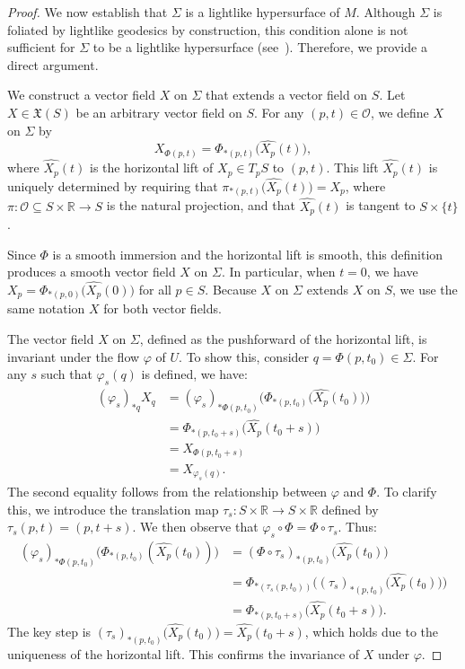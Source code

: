 \documentclass[11pt]{article}
\numberwithin{equation}{section}
\begin{document}
\begin{proof}
		We now establish that $\Sigma$ is a lightlike hypersurface of $M$. Although $\Sigma$ is foliated by lightlike geodesics by construction, this condition alone is not sufficient for $\Sigma$ to be a lightlike hypersurface (see~). Therefore, we provide a direct argument.
		
		We construct a vector field $X$ on $\Sigma$ that extends a vector field on $S$. Let $X \in \mathfrak{X}(S)$ be an arbitrary vector field on $S$. For any $(p, t) \in \mathscr{O}$, we define $X$ on $\Sigma$ by
		\[
		X_{\Phi(p, t)} = \Phi_{*(p, t)}\bigl(\widehat{X_p}(t)\bigr),
		\]
		where $\widehat{X_p}(t)$ is the horizontal lift of $X_p \in T_p S$ to $(p, t)$. This lift $\widehat{X_p}(t)$ is uniquely determined by requiring that $\pi_{*(p, t)}\bigl(\widehat{X_p}(t)\bigr) = X_p$, where $\pi\colon \mathscr{O} \subseteq S \times \mathbb{R} \to S$ is the natural projection, and that $\widehat{X_p}(t)$ is tangent to $S \times \{t\}$.
		
		Since $\Phi$ is a smooth immersion and the horizontal lift is smooth, this definition produces a smooth vector field $X$ on $\Sigma$. In particular, when $t = 0$, we have $X_p = \Phi_{*(p, 0)}\bigl(\widehat{X_p}(0)\bigr)$ for all $p \in S$. Because $X$ on $\Sigma$ extends $X$ on $S$, we use the same notation $X$ for both vector fields.
		
		The vector field $X$ on $\Sigma$, defined as the pushforward of the horizontal lift, is invariant under the flow $\varphi$ of $U$. To show this, consider $q = \Phi(p,t_0) \in \Sigma$. For any $s$ such that $\varphi_s(q)$ is defined, we have:
		\begin{align*}
			(\varphi_s)_{*q}X_q &= (\varphi_s)_{*\Phi(p,t_0)} \bigl(\Phi_{*(p,t_0)}\bigl(\widehat{X_p}(t_0)\bigr)\bigr) \\
			&= \Phi_{*(p,t_0 + s)}\bigl(\widehat{X_p}(t_0 + s)\bigr) \\
			&= X_{\Phi(p,t_0 + s)} \\
			&= X_{\varphi_s(q)}.
		\end{align*}
		The second equality follows from the relationship between $\varphi$ and $\Phi$. To clarify this, we introduce the translation map $\tau_s\colon S \times \mathbb{R} \to S \times \mathbb{R}$ defined by $\tau_s(p,t) = (p, t + s)$. We then observe that $\varphi_s \circ \Phi = \Phi \circ \tau_s$. Thus:
		\begin{align*}
			(\varphi_s)_{*\Phi(p,t_0)} \bigl(\Phi_{*(p,t_0)}(\widehat{X_p}(t_0))\bigr) &= (\Phi \circ \tau_s)_{*(p,t_0)}\bigl(\widehat{X_p}(t_0)\bigr) \\
			&= \Phi_{*(\tau_s(p,t_0))} \bigl((\tau_s)_{*(p,t_0)}\bigl(\widehat{X_p}(t_0)\bigr)\bigr) \\
			&= \Phi_{*(p,t_0 + s)}\bigl(\widehat{X_p}(t_0 + s)\bigr).
		\end{align*}
		The key step is $(\tau_s)_{*(p,t_0)}\bigl(\widehat{X_p}(t_0)\bigr) = \widehat{X_p}(t_0 + s)$, which holds due to the uniqueness of the horizontal lift. This confirms the invariance of $X$ under $\varphi$.
		

\end{proof}
\end{document}
